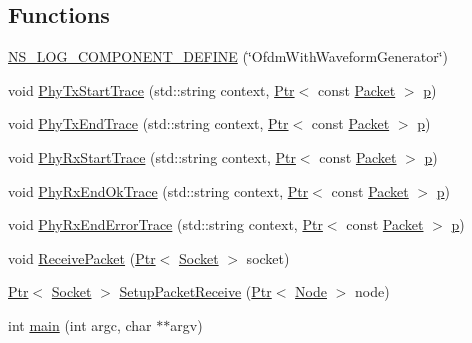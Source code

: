 \subsection*{Functions}
\begin{DoxyCompactItemize}
\item 
\hyperlink{adhoc-aloha-ideal-phy-with-microwave-oven_8cc_a371e3a58f159f591da5ddb77d6a3cb78}{N\+S\+\_\+\+L\+O\+G\+\_\+\+C\+O\+M\+P\+O\+N\+E\+N\+T\+\_\+\+D\+E\+F\+I\+NE} (\char`\"{}Ofdm\+With\+Waveform\+Generator\char`\"{})
\item 
void \hyperlink{adhoc-aloha-ideal-phy-with-microwave-oven_8cc_aef85126bd85f29842c7db47da7ab881a}{Phy\+Tx\+Start\+Trace} (std\+::string context, \hyperlink{classns3_1_1Ptr}{Ptr}$<$ const \hyperlink{classns3_1_1Packet}{Packet} $>$ \hyperlink{lte__link__budget__x2__handover__measures_8m_ac9de518908a968428863f829398a4e62}{p})
\item 
void \hyperlink{adhoc-aloha-ideal-phy-with-microwave-oven_8cc_a1b644fd41107149725fc7c3af0f3ccdf}{Phy\+Tx\+End\+Trace} (std\+::string context, \hyperlink{classns3_1_1Ptr}{Ptr}$<$ const \hyperlink{classns3_1_1Packet}{Packet} $>$ \hyperlink{lte__link__budget__x2__handover__measures_8m_ac9de518908a968428863f829398a4e62}{p})
\item 
void \hyperlink{adhoc-aloha-ideal-phy-with-microwave-oven_8cc_a51ce42e0529cf922b9fa1274522f0894}{Phy\+Rx\+Start\+Trace} (std\+::string context, \hyperlink{classns3_1_1Ptr}{Ptr}$<$ const \hyperlink{classns3_1_1Packet}{Packet} $>$ \hyperlink{lte__link__budget__x2__handover__measures_8m_ac9de518908a968428863f829398a4e62}{p})
\item 
void \hyperlink{adhoc-aloha-ideal-phy-with-microwave-oven_8cc_abe11a97645f01a1213944fb2cbabeb1a}{Phy\+Rx\+End\+Ok\+Trace} (std\+::string context, \hyperlink{classns3_1_1Ptr}{Ptr}$<$ const \hyperlink{classns3_1_1Packet}{Packet} $>$ \hyperlink{lte__link__budget__x2__handover__measures_8m_ac9de518908a968428863f829398a4e62}{p})
\item 
void \hyperlink{adhoc-aloha-ideal-phy-with-microwave-oven_8cc_a515d5357cc68bf748507f70c86651488}{Phy\+Rx\+End\+Error\+Trace} (std\+::string context, \hyperlink{classns3_1_1Ptr}{Ptr}$<$ const \hyperlink{classns3_1_1Packet}{Packet} $>$ \hyperlink{lte__link__budget__x2__handover__measures_8m_ac9de518908a968428863f829398a4e62}{p})
\item 
void \hyperlink{adhoc-aloha-ideal-phy-with-microwave-oven_8cc_a80dc0d980be124d8d5c4ee0b7943bfae}{Receive\+Packet} (\hyperlink{classns3_1_1Ptr}{Ptr}$<$ \hyperlink{classns3_1_1Socket}{Socket} $>$ socket)
\item 
\hyperlink{classns3_1_1Ptr}{Ptr}$<$ \hyperlink{classns3_1_1Socket}{Socket} $>$ \hyperlink{adhoc-aloha-ideal-phy-with-microwave-oven_8cc_a3858f39b0c1d0e52120fef78a82673cb}{Setup\+Packet\+Receive} (\hyperlink{classns3_1_1Ptr}{Ptr}$<$ \hyperlink{classns3_1_1Node}{Node} $>$ node)
\item 
int \hyperlink{adhoc-aloha-ideal-phy-with-microwave-oven_8cc_a3c04138a5bfe5d72780bb7e82a18e627}{main} (int argc, char $\ast$$\ast$argv)
\end{DoxyCompactItemize}

